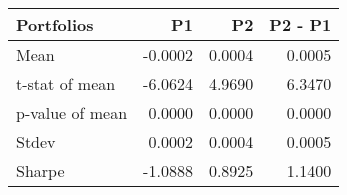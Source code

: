 \begin{tabular}{lrrr}
\toprule
Portfolios & P1 & P2 & P2 - P1 \\
\midrule
Mean & -0.0002 & 0.0004 & 0.0005 \\
t-stat of mean & -6.0624 & 4.9690 & 6.3470 \\
p-value of mean & 0.0000 & 0.0000 & 0.0000 \\
Stdev & 0.0002 & 0.0004 & 0.0005 \\
Sharpe & -1.0888 & 0.8925 & 1.1400 \\
\bottomrule
\end{tabular}
